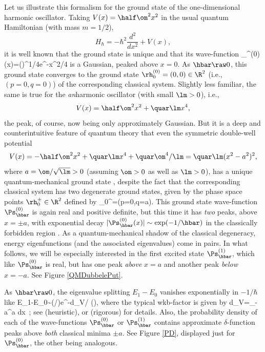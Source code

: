 \documentclass[12pt]{article}
\begin{document}
Let us illustrate this formalism for the  ground state  of the  one-dimensional harmonic oscillator. Taking $V(x)=\half \om^2x^2$   
in  the usual quantum Hamiltonian (with mass $m=1/2$),
\begin{equation}
H_{\hbar}=-\hbar^2\frac{d^2}{dx^2} +V(x), \label{TheHam}
\end{equation}
it is well  known that the ground state is unique  and that its wave-function  
 \beq
 \Ps_{\hbar}^{(0)}(x)=\left(\frac{\om}{2\pi\hbar}\right)^{1/4}e^{-\om x^2/4\hbar}
 \eeq
  is a Gaussian, peaked above $x=0$. As $\hbar\raw 0$, this ground state converges  to the ground state $\rh_0^{(0)}=(0,0)\in\R^2$ (i.e., $(p=0,q=0)$) of the corresponding classical system. 
Slightly less familiar, the same is true for the
 \emph{an}harmonic oscillator (with small  $\lm>0$), i.e., 
\begin{equation}
V(x)=\half \om^2x^2+\quar \lm x^4,\label{Vq2}
\end{equation}
the peak, of course,  now being only approximately Gaussian.
But it is a deep and counterintuitive feature of quantum theory that even the symmetric double-well potential
\begin{equation}
V(x)=-\half \om^2x^2+\quar \lm x^4+\quar\om^4/\lm=\quar \lm (x^2-a^2)^2 , \label{Vq3}
\end{equation}
where $a=\om/\sqrt{\lm}>0$ (assuming $\om>0$ as well as $\lm>0$), has a unique quantum-mechanical  ground state    \cite{HiSi,RS4},
despite the fact that the corresponding classical system has two degenerate ground states, given by the phase space  points $\rh_0^{\pm}\in\R^2$ defined by 
\beq
\rh_0^{\pm}=(p=0,q=\pm a). \label{clgrstates}
\eeq 
This ground state wave-function $\Ps_{\hbar}^{(0)}$  is again real and positive definite, but this time it has \emph{two} peaks, above $x=\pm a$, with exponential decay $|\Ps_{\hbar}^{(0)}(x)|\sim \exp( -1/\hbar)$ in the classically forbidden region  \cite{HiSi,RS4}. 
As a quantum-mechanical shadow of the classical degeneracy, energy eigenfunctions (and the associated eigenvalues) come in pairs. In what follows, we will be especially interested in the first excited state $\Ps_{\hbar}^{(1)}$, which like $\Ps^{(0)}_{\hbar}$ is real, but has one peak \emph{above}  $x=a$ and another peak \emph{below} $x=-a$.
See Figure \ref{QMDubbelePut}. 

As $\hbar\raw 0$,  the eigenvalue splitting $E_1-E_0$ vanishes exponentially in $-1/\hbar$ like
\beq
\Dl\equiv E_1-E_0\sim(\hbar\om/)\cdot e^{-d_V/\hbar} \:\: (\hbar{}), \label{ED}
\eeq
where the typical {\sc wkb}-factor is given by
\beq
d_V=\int_{-a}^a dx\, ; \label{Cwkb}
\eeq
see \cite{Garg,LL} (heuristic), or \cite{Helffer,HiSi,Simon4} (rigorous)  for details. Also,  the probability density of each of the wave-functions $\Ps^{(0)}_{\hbar}$ or $\Ps_{\hbar}^{(1)}$ contains approximate  $\delta$-function peaks above \emph{both} classical minima $\pm a$. See  Figure \ref{PD}, displayed just for $\Ps^{(0)}_{\hbar}$, the other being analogous.
\end{document}
